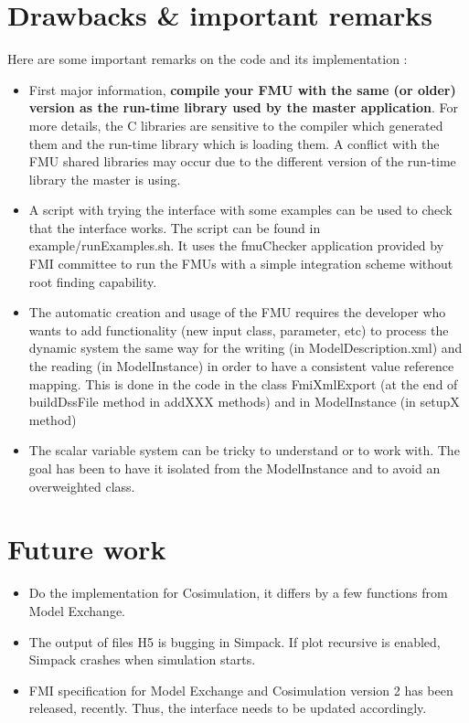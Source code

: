 \documentclass[10pt,a4paper]{report}
\begin{document}
\section{Drawbacks \& important remarks}
Here are some important remarks on the code and its implementation :
%
\begin{itemize}
  \item First major information, \textbf{compile your FMU with the same (or older) version as the run-time library used by the master application}. For more details, the C libraries are sensitive to the compiler which generated them and the run-time library which is loading them. A conflict with the FMU shared libraries may occur due to the different version of the run-time library the master is using.
  \item A script with trying the interface with some examples can be used to check that the interface works. The script can be found in example/runExamples.sh. It uses the fmuChecker application provided by FMI committee to run the FMUs with a simple integration scheme without root finding capability.
  \item The automatic creation and usage of the FMU requires the developer who wants to add functionality (new input class, parameter, etc) to process the dynamic system the same way for the writing (in ModelDescription.xml) and the reading (in ModelInstance) in order to have a consistent value reference mapping. This is done in the code in the class FmiXmlExport (at the end of buildDssFile method in addXXX methods) and in ModelInstance (in setupX method)
  \item The scalar variable system can be tricky to understand or to work with. The goal has been to have it isolated from the ModelInstance and to avoid an overweighted class.
\end{itemize}
%
\section{Future work}
\begin{itemize}
\item Do the implementation for Cosimulation, it differs by a few functions from Model Exchange.
%
\item The output of files H5 is bugging in Simpack. If plot recursive is enabled, Simpack crashes when simulation starts.
%
\item FMI specification for Model Exchange and Cosimulation version 2 has been released, recently. Thus, the interface needs to be updated accordingly.
\end{itemize}
%
\end{document}
